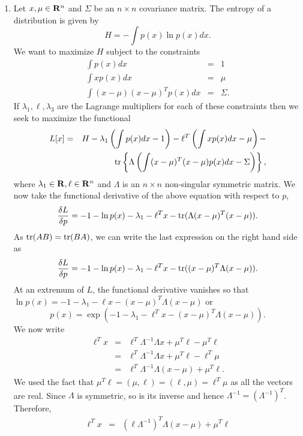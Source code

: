 \begin{enumerate}
\item Let $x, \mu \in \mathbf{R}^n$ and $\Sigma$ be an $n \times n$ covariance matrix. The entropy of a 
distribution is given by
\[
H = -\int p(x)\ln p(x)dx.
\]
We want to maximize $H$ subject to the constraints
\begin{eqnarray}
\int p(x)dx &=& 1 \label{c2pe14} \\
\int xp(x)dx &=& \mu \label{c2pe15} \\
\int (x - \mu)(x - \mu)^Tp(x)dx &=& \Sigma \label{c2pe16} .
\end{eqnarray}
If $\lambda_1, \ell, \lambda_3$ are the Lagrange multipliers for each of these constraints then
we seek to maximize the functional
\begin{eqnarray*}
L[x] &=& H - \lambda_1\left(\int p(x)dx - 1\right) - \ell^T\left(\int xp(x)dx - \mu\right) - \\
 & & \operatorname{tr}\left\{\Lambda\left(\int(x-\mu)^T(x-\mu)p(x)dx - \Sigma\right)\right\},
\end{eqnarray*}
where $\lambda_1 \in \mathbf{R}, \ell \in \mathbf{R}^n$ and $\Lambda$ is an $n \times n$ non-singular 
symmetric matrix. We now take the functional derivative of the above equation with respect to $p$,
\[
\frac{\delta L}{\delta p} = -1 - \ln p(x) - \lambda_1 - \ell^T x - \operatorname{tr}(\Lambda (x - \mu)^T(x - \mu)).
\]
As $\operatorname{tr}(AB) = \operatorname{tr}(BA)$, we can write the last expression on the right hand side as
\[
\frac{\delta L}{\delta p} = -1 - \ln p(x) - \lambda_1 - \ell^T x - \operatorname{tr}((x - \mu)^T\Lambda(x - \mu)).
\]
At an extremum of $L$, the functional derivative vanishes so that $\ln p(x) = -1 - \lambda_1 - \ell x
- (x - \mu)^T\Lambda(x - \mu)$ or
\begin{equation}\label{c2pe17}
p(x) = \exp\left(-1 - \lambda_1 - \ell^T x - (x - \mu)^T\Lambda(x - \mu)\right).
\end{equation}
We now write 
\begin{eqnarray*}
\ell^T x &=& \ell^T \Lambda^{-1} \Lambda x + \mu^T\ell - \mu^T\ell \\
 &=&  \ell^T \Lambda^{-1} \Lambda x + \mu^T\ell - \ell^T\mu \\
 &=& \ell^T\Lambda^{-1}\Lambda(x - \mu) + \mu^T\ell.
\end{eqnarray*}
We used the fact that $\mu^T\ell = (\mu, \ell) = (\ell, \mu) = \ell^T\mu$ as all
the vectors are real. Since $\Lambda$ is symmetric, so is its inverse and hence $\Lambda^{-1}
= (\Lambda^{-1})^T$. Therefore,
\begin{eqnarray*}
\ell^T x &=& (\ell\Lambda^{-1})^T\Lambda(x - \mu) + \mu^T\ell \\

\end{eqnarray*}
\end{enumerate}
